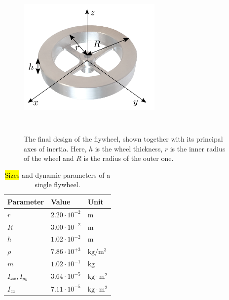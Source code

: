 \documentclass[sensors,article,accept,pdftex,moreauthors]{Definitions/mdpi}
\begin{document}
\begin{figure}[H]%
 
	\includegraphics[width=7cm,height=8cm,keepaspectratio]{figures/flywheel_opaque.png}
	\caption{\small The final design of the flywheel, shown together with its principal axes of inertia. Here, $h$ is the wheel thickness, $r$ is the inner radius of the wheel and $R$ is the radius of the outer one.}
	\label{fig:flywheel}
\end{figure}

\vspace{-6pt}
\begin{table}[H]%
	\caption{\hl{Sizes} %
 and dynamic parameters of a single flywheel.}
	\label{tab:dim_fw}
	\begin{tabularx}{\textwidth}{CCC}
		\toprule
		\textbf{Parameter} & \textbf{Value} & \textbf{Unit}\\
		\midrule
		$r$ & $2.20 \cdot 10^{-2}$ & $\mathrm{m}$ \\
		$R$ & $3.00\cdot 10^{-2}$ & $\mathrm{m}$ \\
		$h$   & $1.02\cdot 10^{-2}$ & $\mathrm{m}$ \\
		$\rho$   & $7.86 \cdot 10^{+3}$ & $\mathrm{kg/m^3}$ \\
		$m$   & $1.02\cdot 10^{-1}$ & $\mathrm{kg}$ \\
		$I_{xx}, I_{yy}$   & $3.64 \cdot 10^{-5}$ & $\mathrm{kg \cdot m^2}$ \\
		$I_{zz}$   & $7.11 \cdot 10^{-5}$ & $ \mathrm{kg \cdot m^2}$\\
		\bottomrule	\end{tabularx}
\end{table}
 
\end{document}
